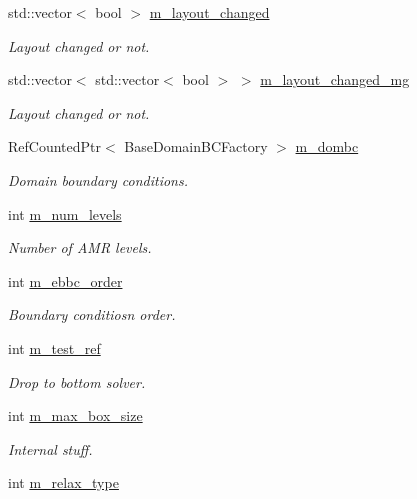 \begin{DoxyCompactItemize}
std\+::vector$<$ bool $>$ \hyperlink{classmfconductivityopfactory_ae828f9e97aa905eb22fccbe48e45838c}{m\+\_\+layout\+\_\+changed}
\begin{DoxyCompactList}\small\item\em Layout changed or not. \end{DoxyCompactList}\item 
std\+::vector$<$ std\+::vector$<$ bool $>$ $>$ \hyperlink{classmfconductivityopfactory_ae4a3a643e4551d5bf5e5b6edf094b4ea}{m\+\_\+layout\+\_\+changed\+\_\+mg}
\begin{DoxyCompactList}\small\item\em Layout changed or not. \end{DoxyCompactList}\item 
Ref\+Counted\+Ptr$<$ Base\+Domain\+B\+C\+Factory $>$ \hyperlink{classmfconductivityopfactory_ac4e5a7e33526139754aebda22170ab87}{m\+\_\+dombc}
\begin{DoxyCompactList}\small\item\em Domain boundary conditions. \end{DoxyCompactList}\item 
int \hyperlink{classmfconductivityopfactory_a79fcbdb831f04881f1f10b244dc8d81d}{m\+\_\+num\+\_\+levels}
\begin{DoxyCompactList}\small\item\em Number of A\+MR levels. \end{DoxyCompactList}\item 
int \hyperlink{classmfconductivityopfactory_adbd54bd67fae0c06e8d5d1a0f92111bf}{m\+\_\+ebbc\+\_\+order}
\begin{DoxyCompactList}\small\item\em Boundary conditiosn order. \end{DoxyCompactList}\item 
int \hyperlink{classmfconductivityopfactory_a751f71d35a148f7bc259ee881bb6c05a}{m\+\_\+test\+\_\+ref}
\begin{DoxyCompactList}\small\item\em Drop to bottom solver. \end{DoxyCompactList}\item 
int \hyperlink{classmfconductivityopfactory_a5e158eddbea0612dcd1521f49b4afedd}{m\+\_\+max\+\_\+box\+\_\+size}
\begin{DoxyCompactList}\small\item\em Internal stuff. \end{DoxyCompactList}\item 
int \hyperlink{classmfconductivityopfactory_aff70724abed17f410a0a4bef3b36a198}{m\+\_\+relax\+\_\+type}

\end{DoxyCompactItemize}
